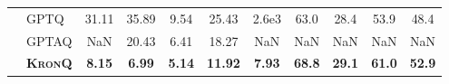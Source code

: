 \documentclass{article} %
\newcommand{\KronQ}{\textsc{KronQ}}
\begin{document}
\begin{table}[]
{\begin{NiceTabular}{c||l|ccc|cc|cccc}
 & GPTQ      & 31.11 & 35.89 & 9.54  & 25.43 & 2.6e3 & 63.0 & 28.4 & 53.9 & 48.4 \\
 & GPTAQ     & NaN   & 20.43 & 6.41  & 18.27 & NaN   & NaN  & NaN  & NaN  & NaN  \\
 & \textbf{\KronQ}
             & \textbf{8.15}
             & \textbf{6.99}
             & \textbf{5.14}
             & \textbf{11.92}
             & \textbf{7.93}
             & \textbf{68.8}
             & \textbf{29.1}
             & \textbf{61.0}
             & \textbf{52.9} \\
\bottomrule
\end{NiceTabular}}
    \vspace{-14pt}
\end{table}

\vspace{-3mm}
\end{document}
